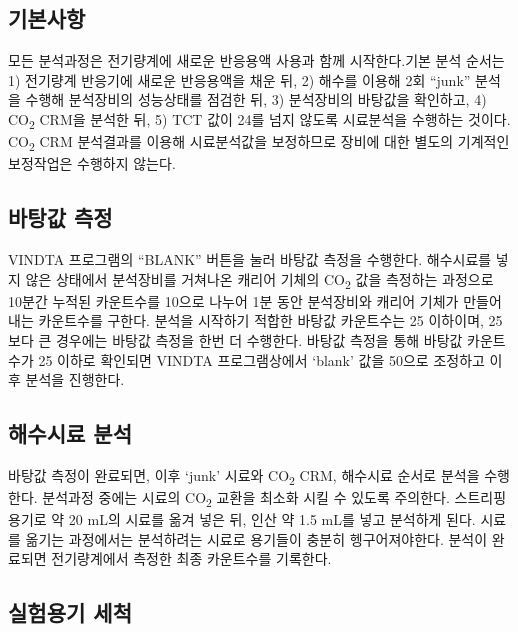 \documentclass[
]{book}
\begin{document}
\hypertarget{uxae30uxbcf8uxc0acuxd56d}{%
\subsection{기본사항}\label{uxae30uxbcf8uxc0acuxd56d}}

모든 분석과정은 전기량계에 새로운 반응용액 사용과 함께 시작한다.기본 분석 순서는 1) 전기량계 반응기에 새로운 반응용액을 채운 뒤, 2) 해수를 이용해 2회 ``junk'' 분석을 수행해 분석장비의 성능상태를 점검한 뒤, 3) 분석장비의 바탕값을 확인하고, 4) CO\textsubscript{2} CRM을 분석한 뒤, 5) TCT 값이 24를 넘지 않도록 시료분석을 수행하는 것이다. CO\textsubscript{2} CRM 분석결과를 이용해 시료분석값을 보정하므로 장비에 대한 별도의 기계적인 보정작업은 수행하지 않는다.

\hypertarget{uxbc14uxd0d5uxac12-uxce21uxc815-1}{%
\subsection{바탕값 측정}\label{uxbc14uxd0d5uxac12-uxce21uxc815-1}}

VINDTA 프로그램의 ``BLANK'' 버튼을 눌러 바탕값 측정을 수행한다. 해수시료를 넣지 않은 상태에서 분석장비를 거쳐나온 캐리어 기체의 CO\textsubscript{2} 값을 측정하는 과정으로 10분간 누적된 카운트수를 10으로 나누어 1분 동안 분석장비와 캐리어 기체가 만들어내는 카운트수를 구한다. 분석을 시작하기 적합한 바탕값 카운트수는 25 이하이며, 25보다 큰 경우에는 바탕값 측정을 한번 더 수행한다. 바탕값 측정을 통해 바탕값 카운트수가 25 이하로 확인되면 VINDTA 프로그램상에서 `blank' 값을 50으로 조정하고 이후 분석을 진행한다.

\hypertarget{uxd574uxc218uxc2dcuxb8cc-uxbd84uxc11d}{%
\subsection{해수시료 분석}\label{uxd574uxc218uxc2dcuxb8cc-uxbd84uxc11d}}

바탕값 측정이 완료되면, 이후 `junk' 시료와 CO\textsubscript{2} CRM, 해수시료 순서로 분석을 수행한다. 분석과정 중에는 시료의 CO\textsubscript{2} 교환을 최소화 시킬 수 있도록 주의한다. 스트리핑 용기로 약 20 mL의 시료를 옮겨 넣은 뒤, 인산 약 1.5 mL를 넣고 분석하게 된다. 시료를 옮기는 과정에서는 분석하려는 시료로 용기들이 충분히 헹구어져야한다. 분석이 완료되면 전기량계에서 측정한 최종 카운트수를 기록한다.

\hypertarget{uxc2e4uxd5d8uxc6a9uxae30-uxc138uxcc99}{%
\subsection{실험용기 세척}\label{uxc2e4uxd5d8uxc6a9uxae30-uxc138uxcc99}}
\end{document}
